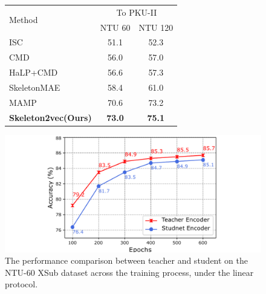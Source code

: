 \begin{figure}[tb]
  \begin{minipage}[b]{0.48\linewidth}
    \centering
    \begin{tabular}{l c c}
      \toprule
      \multirow{2}{*}{Method} &
      \multicolumn{2}{c}{To PKU-II} \\
      & NTU 60 & NTU 120 \\
      \midrule
      ISC \cite{thoker2021skeleton} & 51.1 & 52.3 \\
      CMD \cite{mao2022cmd} & 56.0 & 57.0 \\
      HaLP+CMD \cite{shah2023halp} & 56.6 & 57.3 \\
      SkeletonMAE \cite{wu2023skeletonmae} & 58.4 & 61.0 \\
      MAMP \cite{mao2023masked} & 70.6 & 73.2 \\
      \midrule
      \textbf{Skeleton2vec(Ours)} & \textbf{73.0} & \textbf{75.1} \\
      \bottomrule
    \end{tabular}
    \label{tab:transfer}
  \end{minipage}\hfill
  \begin{minipage}[b]{0.48\linewidth}
    \centering
    \includegraphics[width=0.80\linewidth]{figures/rebuttal_teacher_student.pdf}
    \caption{
      The performance comparison between teacher and student on the NTU-60 XSub
      dataset across the training process, under the linear protocol.
    }
    \label{fig:teacher_and_student}
  \end{minipage}
  \vspace{-15pt}
\end{figure}

